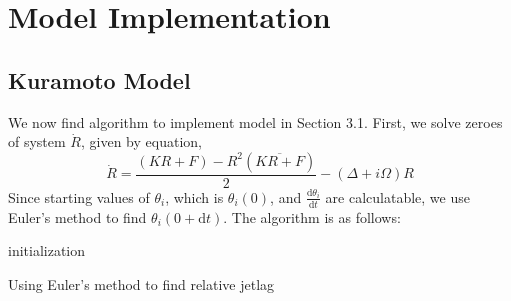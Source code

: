 \newpage


\section{Model Implementation}
\subsection{Kuramoto Model}
We now find algorithm to implement model in Section 3.1. First, we solve zeroes of system $\dot{R}$, given by equation,
$$\dot{R} = \frac{(KR + F) - R^2(\overline{KR + F})}{2} - (\Delta + i\Omega)R$$
Since starting values of $\theta_i$, which is $\theta_i(0)$, and $\frac{\mathrm{d} \theta_i}{\mathrm{d} t}$ are calculatable, we use Euler's method to find $\theta_i(0 + \mathrm{d}t)$. 
The algorithm is as follows:
\begin{center}
\begin{algorithm}[h]
\SetAlgoLined
{}

 \;
 initialization\;
 \;
 \caption{Using Euler's method to find relative jetlag}
\end{algorithm}
\end{center}
